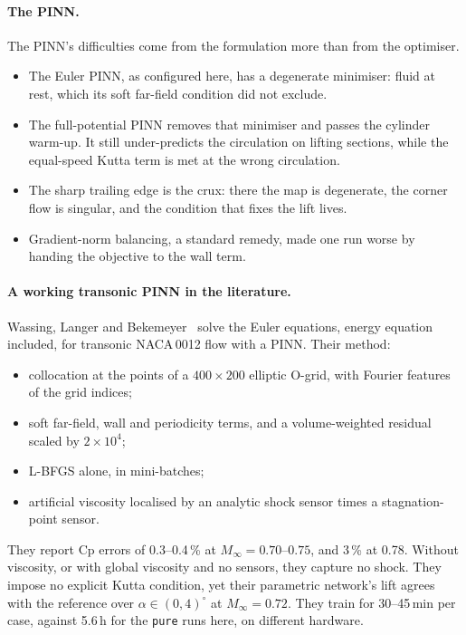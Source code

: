 \documentclass[11pt]{article}
\newcommand{\Ma}{M_\infty}
\begin{document}
\paragraph{The PINN.}
The PINN's difficulties come from the formulation more than from the optimiser.
\begin{itemize}
  \item The Euler PINN, as configured here, has a degenerate minimiser: fluid at rest, which its
    soft far-field condition did not exclude.
  \item The full-potential PINN removes that minimiser and passes the cylinder warm-up. It still
    under-predicts the circulation on lifting sections, while the equal-speed Kutta term is met at
    the wrong circulation.
  \item The sharp trailing edge is the crux: there the map is degenerate, the corner flow is
    singular, and the condition that fixes the lift lives.
  \item Gradient-norm balancing, a standard remedy, made one run worse by handing the objective to
    the wall term.
\end{itemize}

\paragraph{A working transonic PINN in the literature.}
Wassing, Langer and Bekemeyer~\cite{wassing2025} solve the Euler equations, energy equation
included, for transonic NACA\,0012 flow with a PINN. Their method:
\begin{itemize}
  \item collocation at the points of a $400\times200$ elliptic O-grid, with Fourier features of
    the grid indices;
  \item soft far-field, wall and periodicity terms, and a volume-weighted residual scaled by
    $2\times10^4$;
  \item L-BFGS alone, in mini-batches;
  \item artificial viscosity localised by an analytic shock sensor times a stagnation-point
    sensor.
\end{itemize}
They report Cp errors of 0.3--0.4\,\% at $\Ma = 0.70$--$0.75$, and 3\,\% at 0.78. Without
viscosity, or with global viscosity and no sensors, they capture no shock. They impose no explicit
Kutta condition, yet their parametric network's lift agrees with the reference over
$\alpha\in(0,4)^\circ$ at $\Ma = 0.72$.
They train for 30--45\,min per case, against 5.6\,h for the \texttt{pure} runs here, on different
hardware.
\end{document}

